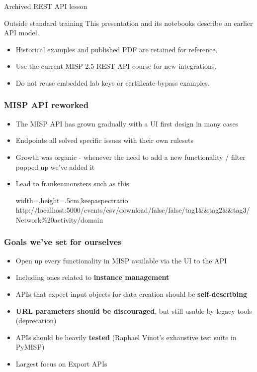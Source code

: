 
\begin{frame}[t,plain]
\titlepage
\end{frame}

\begin{frame}{Archived REST API lesson}
  \begin{alertblock}{Outside standard training}
    This presentation and its notebooks describe an earlier API model.
  \end{alertblock}
  \begin{itemize}
    \item Historical examples and published PDF are retained for reference.
    \item Use the current MISP 2.5 REST API course for new integrations.
    \item Do not reuse embedded lab keys or certificate-bypass examples.
  \end{itemize}
\end{frame}


\begin{frame}
\frametitle{MISP API reworked}
    \begin{itemize}
        \item The MISP API has grown gradually with a UI first design in many cases
        \item Endpoints all solved specific issues with their own rulesets
	\item Growth was organic - whenever the need to add a new functionality / filter popped up we've added it
	\item Lead to frankenmonsters such as this:
		\begin{adjustbox}{width=\textwidth,height=.5cm,keepaspectratio}
		    http://localhost:5000/events/csv/download/false/false/tag1\&\&tag2\&\&\!tag3/Network\%20activity/domain
		\end{adjustbox}
    \end{itemize}
\end{frame}

\begin{frame}
\frametitle{Goals we've set for ourselves}
    \begin{itemize}
        \item Open up every functionality in MISP available via the UI to the API
	\item Including ones related to {\bf instance management}
	\item APIs that expect input objects for data creation should be {\bf self-describing}
	\item {\bf URL parameters should be discouraged}, but still usable by legacy tools (deprecation)
	\item APIs should be heavily {\bf tested} (Raphael Vinot's exhaustive test suite in PyMISP)
	\item Largest focus on Export APIs
    \end{itemize}
\end{frame}


